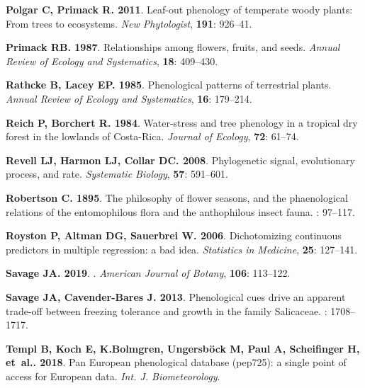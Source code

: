 \documentclass[11pt]{article}
\begin{document}
{\begin{thebibliography}{39}
{
{\bf Polgar C, Primack R}{\bf . 2011}.
\newblock Leaf-out phenology of temperate woody plants: From trees to
  ecosystems.
\newblock \emph{New Phytologist}, {\bf 191}: 926--41.

{\bf Primack RB}{\bf . 1987}.
\newblock Relationships among flowers, fruits, and seeds.
\newblock \emph{Annual Review of Ecology and Systematics}, {\bf 18}: 409--430.

{\bf Rathcke B, Lacey EP}{\bf . 1985}.
\newblock Phenological patterns of terrestrial plants.
\newblock \emph{Annual Review of Ecology and Systematics}, {\bf 16}: 179--214.

{\bf Reich P, Borchert R}{\bf . {1984}}.
\newblock Water-stress and tree phenology in a tropical dry forest in the
  lowlands of Costa-Rica.
\newblock \emph{{Journal of Ecology}}, {\bf {72}}: {61--74}.

{\bf Revell LJ, Harmon LJ, Collar DC}{\bf . 2008}.
\newblock Phylogenetic signal, evolutionary process, and rate.
\newblock \emph{Systematic Biology}, {\bf 57}: 591--601.

{\bf Robertson C}{\bf . 1895}.
\newblock The philosophy of flower seasons, and the phaenological relations of
  the entomophilous flora and the anthophilous insect fauna.
: 97--117.

{\bf Royston P, Altman DG, Sauerbrei W}{\bf . 2006}.
\newblock Dichotomizing continuous predictors in multiple regression: a bad
  idea.
\newblock \emph{Statistics in Medicine}, {\bf 25}: 127--141.

{\bf Savage JA}{\bf . {2019}}.
.
\newblock \emph{{American Journal of Botany}}, {\bf {106}}: {113--122}.

{\bf Savage JA, Cavender-Bares J}{\bf . 2013}.
\newblock Phenological cues drive an apparent trade-off between freezing
  tolerance and growth in the family Salicaceae.
: 1708--1717.

{\bf Templ B, Koch E, K.Bolmgren, Ungersb{\"o}ck M, Paul A, Scheifinger H,
  et~al.}{\bf . 2018}.
\newblock Pan European phenological database (pep725): a single point of access
  for European data.
\newblock \emph{Int. J. Biometeorology}.

}
\end{thebibliography}}
\end{document}
